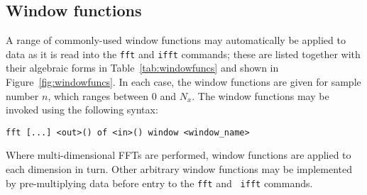 \subsection{Window functions}

A range of commonly-used window functions may automatically be applied to data
as it is read into the {\tt fft} and {\tt ifft} commands; these are listed
together with their algebraic forms in Table~\ref{tab:windowfuncs} and shown in
Figure~\ref{fig:windowfuncs}. In each case, the window functions are given for
sample number $n$, which ranges between $0$ and $N_x$. The window functions may
be invoked using the following syntax:

\begin{verbatim}
fft [...] <out>() of <in>() window <window_name>
\end{verbatim}

\noindent Where multi-dimensional FFTs are performed, window functions are
applied to each dimension in turn.  Other arbitrary window functions may be
implemented by pre-multiplying data before entry to the {\tt fft} and {\tt
ifft} commands.

